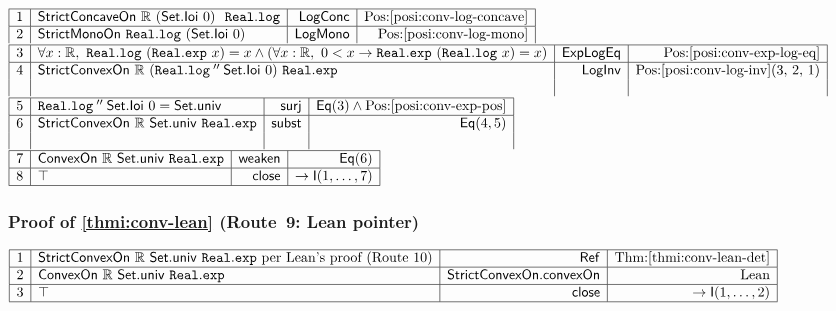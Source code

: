 \documentclass[11pt,reqno]{amsart}
\theoremstyle{redplain}
\numberwithin{equation}{section}
\begin{document}
\begin{center}
$%
\begin{array}{|c|l|r|r|}
\hline
1 & \mathsf{StrictConcaveOn}\ \mathbb{R}\ (\mathsf{Set.Ioi}\ 0)\ \mathtt{\
Real.log} & \mathsf{LogConc} & \mbox{Pos:\ref{posi:conv-log-concave}} \\ 
\hline
2 & \mathsf{StrictMonoOn}\ \mathtt{Real.log}\ (\mathsf{Set.Ioi}\ 0) & 
\mathsf{LogMono} & \mbox{Pos:\ref{posi:conv-log-mono}}%
\end{array}%
$ \noindent $%
\begin{array}{|c|l|r|r|}
\hline
3 & \forall x:\mathbb{R},\ \mathtt{Real.log}\ (\mathtt{Real.exp}\ x)=x\wedge
(\forall x:\mathbb{R},\ 0<x\rightarrow \mathtt{Real.exp}\ (\mathtt{Real.log}
\ x)=x) & \mathsf{ExpLogEq} & \mbox{Pos:\ref{posi:conv-exp-log-eq}} \\ \hline
4 & \mathsf{StrictConvexOn}\ \mathbb{R}\ (\mathtt{Real.log}\mathbin{''}%
\mathsf{Set.Ioi}\ 0)\ \mathtt{Real.exp} & \mathsf{LogInv} & %
\mbox{Pos:\ref{posi:conv-log-inv}(3, 2, 1)} \\ 
&  &  & 
\end{array}%
$ \noindent $%
\begin{array}{|c|l|r|r|}
\hline
5 & \mathtt{Real.log}\mathbin{''}\mathsf{Set.Ioi}\ 0 = \mathsf{Set.univ} & 
\mathsf{surj} & \mathsf{Eq}(3)\wedge \mbox{Pos:\ref{posi:conv-exp-pos}} \\ 
\hline
6 & \mathsf{StrictConvexOn}\ \mathbb{R}\ \mathsf{Set.univ}\ \mathtt{Real.exp}
& \mathsf{subst} & \mathsf{Eq}(4,5) \\ 
&  &  & 
\end{array}%
$ \noindent $%
\begin{array}{|c|l|r|r|}
\hline
7 & \mathsf{ConvexOn}\ \mathbb{R}\ \mathsf{Set.univ}\ \mathtt{Real.exp} & 
\mathsf{weaken} & \mathsf{Eq}(6) \\ \hline
8 & \top & \mathsf{close} & \rightarrow \mathsf{I}(1,\dots ,7) \\ \hline
\end{array}%
$
\end{center}

\subsubsection*{Proof of \autoref{thmi:conv-lean} (Route~9: Lean pointer)}

\begin{center}
$%
\begin{array}{|c|l|r|r|}
\hline
1 & \mathsf{StrictConvexOn}\ \mathbb{R}\ \mathsf{Set.univ}\ \mathtt{Real.exp}
\ \text{per Lean's proof (Route~10)} & \mathsf{Ref} & \mbox{Thm:%
\ref{thmi:conv-lean-det}} \\ \hline
2 & \mathsf{ConvexOn}\ \mathbb{R}\ \mathsf{Set.univ}\ \mathtt{Real.exp} & 
\mathsf{StrictConvexOn}.\allowbreak\mathsf{convexOn} & \text{Lean} \\ \hline
3 & \top & \mathsf{close} & \rightarrow \mathsf{I}(1,\dots ,2) \\ \hline
\end{array}%
$
\end{center}
\end{document}
